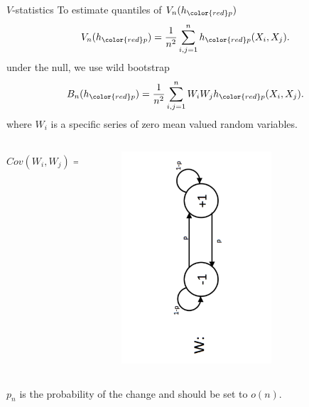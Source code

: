 \documentclass{beamer}
\begin{document}
 
  \begin{frame}{$V$-statistics}
To estimate quantiles of $ V_n(h_{\color{red} p})$  
\[
 V_n(h_{\color{red} p}) = \frac {1} {n^2} \sum_{i,j=1}^n h_{\color{red} p}(X_i,X_j).
\]
under the null, we use wild bootstrap
\[
 B_n(h_{\color{red} p}) = \frac {1} {n^2} \sum_{i,j=1}^n W_i W_j h_{\color{red} p}(X_i,X_j).
\]
  where $W_i$ is a specific series of zero mean valued random variables.
  
 \vspace{-1cm} 
\begin{columns}
        \begin{column}{.5\textwidth}
         $$
  Cov(W_i,W_j) = (1-2p_n)^{-|i-j|}
  $$
        \end{column}
        \begin{column}{.5\textwidth}
            \begin{figure}
            \vspace{-0.5cm}
           \includegraphics[width=0.7\textwidth, angle =-90 ]{./img/W_graphicalModel.pdf} 
        \end{figure}
        \end{column}
    \end{columns}
\vspace{-1cm}
    $p_n$ is  the probability of the change  and should be set to $o(n)$.
  \end{frame}
\end{document}
